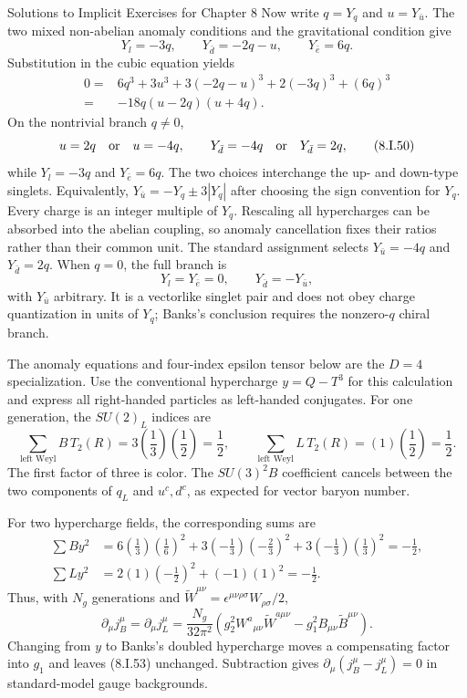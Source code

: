 \begin{bankssolutions}{Solutions to Implicit Exercises for Chapter 8}
Now write $q=Y_q$ and $u=Y_{\bar u}$.  The two mixed non-abelian anomaly
conditions and the gravitational condition give
\[
 Y_l=-3q,\qquad Y_{\bar d}=-2q-u,\qquad Y_{\bar e}=6q. \tag{8.I.48}
\]
Substitution in the cubic equation yields
\begin{align*}
0={}&6q^3+3u^3+3(-2q-u)^3+2(-3q)^3+(6q)^3\\
={}&-18q(u-2q)(u+4q). \tag{8.I.49}
\end{align*}
On the nontrivial branch $q\ne0$,
\[
 u=2q\quad\hbox{or}\quad u=-4q,
 \qquad Y_{\bar d}=-4q\quad\hbox{or}\quad Y_{\bar d}=2q, \tag{8.I.50}
\]
while $Y_l=-3q$ and $Y_{\bar e}=6q$.  The two choices interchange the up- and
down-type singlets.  Equivalently,
$Y_{\bar u}=-Y_q\pm3|Y_q|$ after choosing the sign convention for $Y_q$.
Every charge is an integer multiple of $Y_q$.  Rescaling all hypercharges can
be absorbed into the abelian coupling, so anomaly cancellation fixes their
ratios rather than their common unit.  The standard assignment selects
$Y_{\bar u}=-4q$ and $Y_{\bar d}=2q$.  When $q=0$, the full branch is
\[
 Y_l=Y_{\bar e}=0,\qquad Y_{\bar d}=-Y_{\bar u},
\]
with $Y_{\bar u}$ arbitrary.  It is a vectorlike singlet pair and does not
obey charge quantization in units of $Y_q$; Banks's conclusion requires the
nonzero-$q$ chiral branch.

The anomaly equations and four-index epsilon tensor below are the $D=4$
specialization.
Use the conventional hypercharge $y=Q-T^3$ for this calculation and express
all right-handed particles as left-handed conjugates.  For one generation,
the $SU(2)_L$ indices are
\[
 \sum_{\text{left Weyl}} B\,T_2(R)
 =3\left(\frac13\right)\left(\frac12\right)=\frac12,
 \qquad
 \sum_{\text{left Weyl}} L\,T_2(R)
 =(1)\left(\frac12\right)=\frac12. \tag{8.I.51}
\]
The first factor of three is color.  The $SU(3)^2B$ coefficient cancels
between the two components of $q_L$ and $u^c,d^c$, as expected for vector
baryon number.

For two hypercharge fields, the corresponding sums are
\begin{align*}
 \sum B y^2
 &=6\left(\frac13\right)\left(\frac16\right)^2
 +3\left(-\frac13\right)\left(-\frac23\right)^2
 +3\left(-\frac13\right)\left(\frac13\right)^2=-\frac12,\\
 \sum L y^2
 &=2(1)\left(-\frac12\right)^2+(-1)(1)^2=-\frac12.
 \tag{8.I.52}
\end{align*}
Thus, with $N_g$ generations and
$\widetilde W^{\mu\nu}=\epsilon^{\mu\nu\rho\sigma}W_{\rho\sigma}/2$,
\[
 \partial_\mu j_B^\mu=\partial_\mu j_L^\mu
 =\frac{N_g}{32\pi^2}\left(
   g_2^2W^a{}_{\mu\nu}\widetilde W^{a\mu\nu}
 -g_1^2B_{\mu\nu}\widetilde B^{\mu\nu}\right). \tag{8.I.53}
\]
Changing from $y$ to Banks's doubled hypercharge moves a compensating factor
into $g_1$ and leaves (8.I.53) unchanged.  Subtraction gives
$\partial_\mu(j_B^\mu-j_L^\mu)=0$ in standard-model gauge backgrounds.


\end{bankssolutions}
